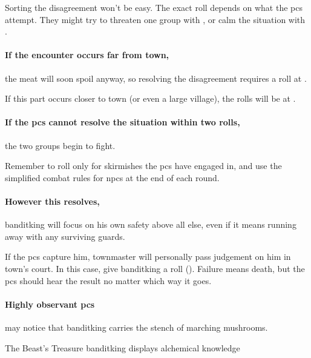 Sorting the disagreement won't be easy.
The exact roll depends on what the \glspl{pc} attempt.
They might try to threaten one group with , or calm the situation with .


\paragraph{If the encounter occurs far from \gls{town},}
the meat will soon spoil anyway, so resolving the disagreement requires a roll at \tn[9].

If this part occurs closer to \gls{town} (or even a large \gls{village}), the rolls will be at \tn[12].

\paragraph{If the \glspl{pc} cannot resolve the situation within two rolls,}
the two groups begin to fight.

Remember to roll only for skirmishes the \glspl{pc} have engaged in, and use the simplified combat rules for \glspl{npc} at the end of each round.%

\banditking

\paragraph{However this resolves,}
\gls{banditking} will focus on his own safety above all else, even if it means running away with any surviving guards.

If the \glspl{pc} capture him, \gls{townmaster} will personally pass judgement on him in \gls{town}'s \gls{court}.
In this case, give \gls{banditking} a  roll (\tn[8]).
Failure means death, but the \glspl{pc} should hear the result no matter which way it goes.

\paragraph{Highly observant \glspl{pc}}
may notice that \gls{banditking} carries the stench of marching mushrooms.%

{The Beast's Treasure}%
{\Gls{banditking} displays alchemical knowledge}%


